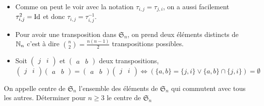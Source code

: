 \begin{prop}
    \begin{itemize}
        \item Comme on peut le voir avec la notation $\tau_{i,j}=\tau_{j,i}$, on a aussi facilement $\tau^2_{i,j}=\operatorname{Id}$ et donc $\tau_{i,j}=\tau^{-1}_{i,j}$.
        \item Pour avoir une transposition dans $\mathfrak{S}_n$, on prend deux éléments distincts de $\mathbb{N}_n$ c'est à dire $\binom{n}{2}=\frac{n(n-1)}{2}$ transpositions possibles.
        \item Soit $\begin{pmatrix}
            j & i
            \end{pmatrix}$ et $\begin{pmatrix}
                a & b
                \end{pmatrix}$ deux transpositions, $\begin{pmatrix}
                    j & i
                    \end{pmatrix}\begin{pmatrix}
                        a & b
                        \end{pmatrix}=\begin{pmatrix}
                            a & b
                            \end{pmatrix}\begin{pmatrix}
                                j & i
                                \end{pmatrix}\iff (\{a,b\}=\{j,i\} \vee \{a,b\}\cap\{j,i\})=\emptyset$ 
    \end{itemize}
\end{prop}
\begin{exo}
    On appelle centre de $\mathfrak{S}_n$ l'ensemble des éléments de $\mathfrak{S}_n$ qui commutent avec tous les autres.
    Déterminer pour $n\geq 3$ le centre de $\mathfrak{S}_n$
\end{exo}
